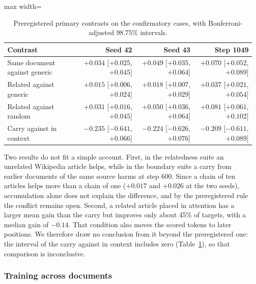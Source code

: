 \documentclass[10pt]{article} %
\begin{document}
\begin{table}[tbp]
  \centering
  \small
  \begin{adjustbox}{max width=\linewidth}
  \begin{tabular}{lrrr}
    \toprule
    Contrast & Seed 42 & Seed 43 & Step 1049 \\
    \midrule
    Same document against generic & $+0.034$ {\footnotesize [$+0.025$, $+0.045$]} & $+0.049$ {\footnotesize [$+0.035$, $+0.064$]} & $+0.070$ {\footnotesize [$+0.052$, $+0.089$]} \\
    Related against generic & $+0.015$ {\footnotesize [$+0.006$, $+0.024$]} & $+0.018$ {\footnotesize [$+0.007$, $+0.029$]} & $+0.037$ {\footnotesize [$+0.021$, $+0.054$]} \\
    Related against random & $+0.031$ {\footnotesize [$+0.016$, $+0.045$]} & $+0.050$ {\footnotesize [$+0.036$, $+0.064$]} & $+0.081$ {\footnotesize [$+0.061$, $+0.102$]} \\
    Carry against in context & $-0.235$ {\footnotesize [$-0.641$, $+0.066$]} & $-0.224$ {\footnotesize [$-0.626$, $+0.076$]} & $-0.209$ {\footnotesize [$-0.611$, $+0.089$]} \\
    \bottomrule
  \end{tabular}
  \end{adjustbox}
    \caption{Preregistered primary contrasts on the confirmatory cases, with Bonferroni-adjusted 98.75\% intervals.}
  \label{tab-primary}
\end{table}

Two results do not fit a simple account. First, in the relatedness suite an unrelated Wikipedia article helps, while in the boundary suite a carry from earlier documents of the same source harms at step 600. Since a chain of ten articles helps more than a chain of one ($+0.017$ and $+0.026$ at the two seeds), accumulation alone does not explain the difference, and by the preregistered rule the conflict remains open. Second, a related article placed in attention has a larger mean gain than the carry but improves only about 45\% of targets, with a median gain of $-0.14$. That condition also moves the scored tokens to later positions. We therefore draw no conclusion from it beyond the preregistered one: the interval of the carry against in context includes zero (Table~\ref{tab-primary}), so that comparison is inconclusive.

\subsubsection{Training across documents}
\label{sec-across}
\end{document}
